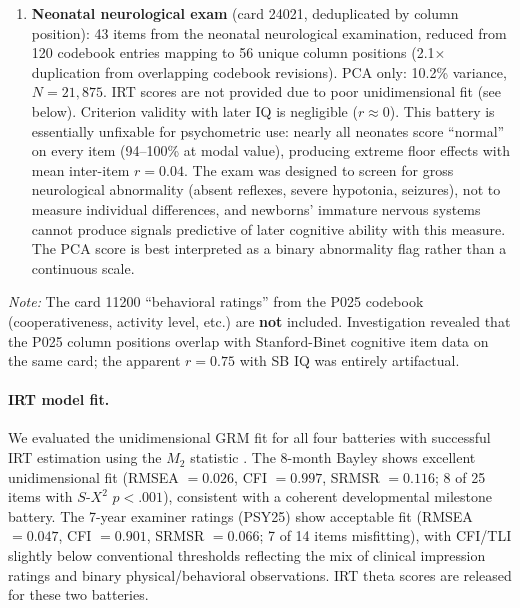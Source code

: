 \documentclass[12pt]{article}
\begin{document}
\begin{enumerate}
\item \textbf{Neonatal neurological exam} (card 24021, deduplicated by column position): 43 items from the neonatal neurological examination, reduced from 120 codebook entries mapping to 56 unique column positions (2.1$\times$ duplication from overlapping codebook revisions). PCA only: 10.2\% variance, $N = 21{,}875$. IRT scores are not provided due to poor unidimensional fit (see below). Criterion validity with later IQ is negligible ($r \approx 0$). This battery is essentially unfixable for psychometric use: nearly all neonates score ``normal'' on every item (94--100\% at modal value), producing extreme floor effects with mean inter-item $r = 0.04$. The exam was designed to screen for gross neurological abnormality (absent reflexes, severe hypotonia, seizures), not to measure individual differences, and newborns' immature nervous systems cannot produce signals predictive of later cognitive ability with this measure. The PCA score is best interpreted as a binary abnormality flag rather than a continuous scale.
\end{enumerate}

\noindent\textit{Note:} The card 11200 ``behavioral ratings'' from the P025 codebook (cooperativeness, activity level, etc.) are \textbf{not} included. Investigation revealed that the P025 column positions overlap with Stanford-Binet cognitive item data on the same card; the apparent $r = 0.75$ with SB IQ was entirely artifactual.

\paragraph{IRT model fit.} We evaluated the unidimensional GRM fit for all four batteries with successful IRT estimation using the $M_2$ statistic \citep{maydeu2006}. The 8-month Bayley shows excellent unidimensional fit (RMSEA $= 0.026$, CFI $= 0.997$, SRMSR $= 0.116$; 8 of 25 items with $S$-$X^2$ $p < .001$), consistent with a coherent developmental milestone battery. The 7-year examiner ratings (PSY25) show acceptable fit (RMSEA $= 0.047$, CFI $= 0.901$, SRMSR $= 0.066$; 7 of 14 items misfitting), with CFI/TLI slightly below conventional thresholds reflecting the mix of clinical impression ratings and binary physical/behavioral observations. IRT theta scores are released for these two batteries.
\end{document}
